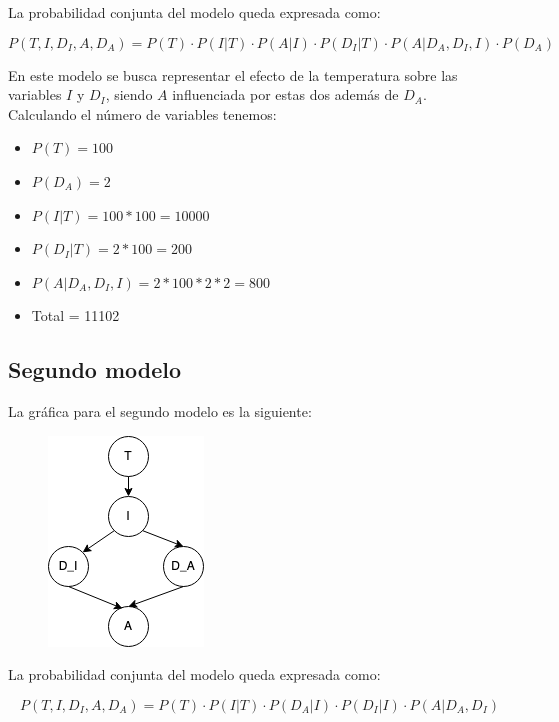 \documentclass[letterpaper,12pt]{article}
\theoremstyle{definition}
\begin{document}
La probabilidad conjunta del modelo queda expresada como:

\begin{equation}
  P(T,I,D_I,A,D_A) = P(T)\cdot P(I|T) \cdot P(A|I) \cdot P(D_I|T)\cdot P(A|D_A,D_I,I) \cdot P(D_A) 
\end{equation}

En este modelo se busca representar el efecto de la temperatura sobre las variables \(I\) y \(D_I\), siendo \(A\) influenciada por estas dos además de \(D_A\).\\

Calculando el número de variables tenemos:

\begin{itemize}
	\item \(P(T) = 100\)
	\item \(P(D_A) = 2\)
	\item \(P(I|T) = 100 * 100 = 10000\)
	\item \(P(D_I|T) = 2 * 100 = 200\)
	\item \(P(A|D_A,D_I,I) = 2 * 100 * 2 * 2 = 800\)
	\item Total = 11102
\end{itemize}




\subsection*{Segundo modelo}

La gráfica para el segundo modelo es la siguiente: \\
\begin{figure}[H]
	\centering
	\includegraphics{m2}
\end{figure}


La probabilidad conjunta del modelo queda expresada como:

\begin{equation}
P(T,I,D_I,A,D_A) = P(T)\cdot P(I|T) \cdot P(D_A|I) \cdot P(D_I|I)\cdot P(A|D_A,D_I)
\end{equation}
\end{document}
